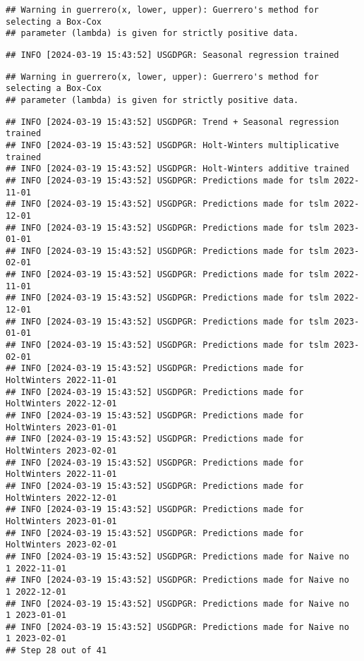 \documentclass[
]{article}
\begin{document}
\begin{verbatim}
## Warning in guerrero(x, lower, upper): Guerrero's method for selecting a Box-Cox
## parameter (lambda) is given for strictly positive data.
\end{verbatim}

\begin{verbatim}
## INFO [2024-03-19 15:43:52] USGDPGR: Seasonal regression trained
\end{verbatim}

\begin{verbatim}
## Warning in guerrero(x, lower, upper): Guerrero's method for selecting a Box-Cox
## parameter (lambda) is given for strictly positive data.
\end{verbatim}

\begin{verbatim}
## INFO [2024-03-19 15:43:52] USGDPGR: Trend + Seasonal regression trained
## INFO [2024-03-19 15:43:52] USGDPGR: Holt-Winters multiplicative trained
## INFO [2024-03-19 15:43:52] USGDPGR: Holt-Winters additive trained
## INFO [2024-03-19 15:43:52] USGDPGR: Predictions made for tslm 2022-11-01
## INFO [2024-03-19 15:43:52] USGDPGR: Predictions made for tslm 2022-12-01
## INFO [2024-03-19 15:43:52] USGDPGR: Predictions made for tslm 2023-01-01
## INFO [2024-03-19 15:43:52] USGDPGR: Predictions made for tslm 2023-02-01
## INFO [2024-03-19 15:43:52] USGDPGR: Predictions made for tslm 2022-11-01
## INFO [2024-03-19 15:43:52] USGDPGR: Predictions made for tslm 2022-12-01
## INFO [2024-03-19 15:43:52] USGDPGR: Predictions made for tslm 2023-01-01
## INFO [2024-03-19 15:43:52] USGDPGR: Predictions made for tslm 2023-02-01
## INFO [2024-03-19 15:43:52] USGDPGR: Predictions made for HoltWinters 2022-11-01
## INFO [2024-03-19 15:43:52] USGDPGR: Predictions made for HoltWinters 2022-12-01
## INFO [2024-03-19 15:43:52] USGDPGR: Predictions made for HoltWinters 2023-01-01
## INFO [2024-03-19 15:43:52] USGDPGR: Predictions made for HoltWinters 2023-02-01
## INFO [2024-03-19 15:43:52] USGDPGR: Predictions made for HoltWinters 2022-11-01
## INFO [2024-03-19 15:43:52] USGDPGR: Predictions made for HoltWinters 2022-12-01
## INFO [2024-03-19 15:43:52] USGDPGR: Predictions made for HoltWinters 2023-01-01
## INFO [2024-03-19 15:43:52] USGDPGR: Predictions made for HoltWinters 2023-02-01
## INFO [2024-03-19 15:43:52] USGDPGR: Predictions made for Naive no  1 2022-11-01
## INFO [2024-03-19 15:43:52] USGDPGR: Predictions made for Naive no  1 2022-12-01
## INFO [2024-03-19 15:43:52] USGDPGR: Predictions made for Naive no  1 2023-01-01
## INFO [2024-03-19 15:43:52] USGDPGR: Predictions made for Naive no  1 2023-02-01
## Step 28 out of 41
\end{verbatim}
\end{document}
